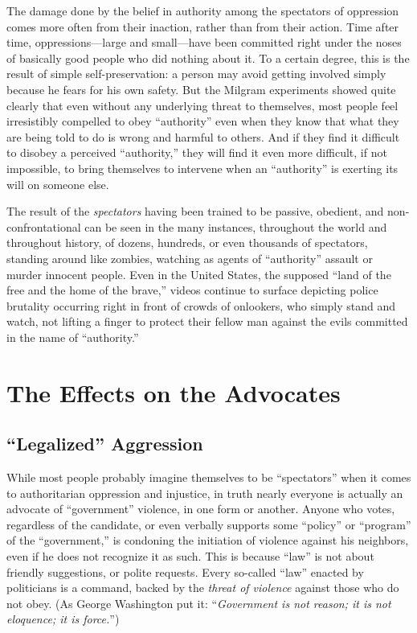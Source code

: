 \documentclass{book}
\begin{document}
The damage done by the belief in authority among the spectators of oppression comes more often from their inaction, rather than from their action. Time after time, oppressions---large and small---have been committed right under the noses of basically good people who did nothing about it. To a certain degree, this is the result of simple self-preservation: a person may avoid getting involved simply because he fears for his own safety. But the Milgram experiments showed quite clearly that even without any underlying threat to themselves, most people feel irresistibly compelled to obey \enquote{authority} even when they know that what they are being told to do is wrong and harmful to others. And if they find it difficult to disobey a perceived \enquote{authority,} they will find it even more difficult, if not impossible, to bring themselves to intervene when an \enquote{authority} is exerting its will on someone else.

The result of the \emph{spectators} having been trained to be passive, obedient, and non-confrontational can be seen in the many instances, throughout the world and throughout history, of dozens, hundreds, or even thousands of spectators, standing around like zombies, watching as agents of \enquote{authority} assault or murder innocent people. Even in the United States, the supposed \enquote{land of the free and the home of the brave,} videos continue to surface depicting police brutality occurring right in front of crowds of onlookers, who simply stand and watch, not lifting a finger to protect their fellow man against the evils committed in the name of \enquote{authority.}

\chapter{The Effects on the Advocates}

\section{\enquote{Legalized} Aggression}

While most people probably imagine themselves to be \enquote{spectators} when it comes to authoritarian oppression and injustice, in truth nearly everyone is actually an advocate of \enquote{government} violence, in one form or another. Anyone who votes, regardless of the candidate, or even verbally supports some \enquote{policy} or \enquote{program} of the \enquote{government,} is condoning the initiation of violence against his neighbors, even if he does not recognize it as such. This is because \enquote{law} is not about friendly suggestions, or polite requests. Every so-called \enquote{law} enacted by politicians is a command, backed by the \emph{threat of violence} against those who do not obey. (As George Washington put it: \enquote{\emph{Government is not reason; it is not eloquence; it is force.}})
\end{document}
